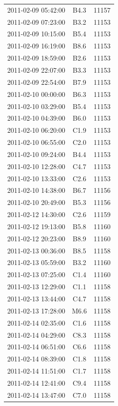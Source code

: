 \documentclass[referee,a4paper,12pt]{swsc}
\begin{document}
\begin{linenumbers}
\begin{longtable}{c|c|c}
		2011-02-09 05:42:00 & B4.3 & 11157 \\ 
		2011-02-09 07:23:00 & B3.2 & 11153 \\ 
		2011-02-09 10:15:00 & B5.4 & 11153 \\ 
		2011-02-09 16:19:00 & B8.6 & 11153 \\ 
		2011-02-09 18:59:00 & B2.6 & 11153 \\ 
		2011-02-09 22:07:00 & B3.3 & 11153 \\ 
		2011-02-09 22:54:00 & B7.9 & 11153 \\ 
		2011-02-10 00:00:00 & B6.3 & 11153 \\ 
		2011-02-10 03:29:00 & B5.4 & 11153 \\ 
		2011-02-10 04:39:00 & B6.0 & 11153 \\ 
		2011-02-10 06:20:00 & C1.9 & 11153 \\ 
		2011-02-10 06:55:00 & C2.0 & 11153 \\ 
		2011-02-10 09:24:00 & B4.4 & 11153 \\ 
		2011-02-10 12:28:00 & C4.7 & 11153 \\ 
		2011-02-10 13:33:00 & C2.6 & 11153 \\ 
		2011-02-10 14:38:00 & B6.7 & 11156 \\ 
		2011-02-10 20:49:00 & B5.3 & 11156 \\ 
		2011-02-12 14:30:00 & C2.6 & 11159 \\ 
		2011-02-12 19:13:00 & B5.8 & 11160 \\ 
		2011-02-12 20:23:00 & B8.9 & 11160 \\ 
		2011-02-13 00:36:00 & B8.5 & 11158 \\ 
		2011-02-13 05:59:00 & B3.2 & 11160 \\ 
		2011-02-13 07:25:00 & C1.4 & 11160 \\ 
		2011-02-13 12:29:00 & C1.1 & 11158 \\ 
		2011-02-13 13:44:00 & C4.7 & 11158 \\ 
		2011-02-13 17:28:00 & M6.6 & 11158 \\ 
		2011-02-14 02:35:00 & C1.6 & 11158 \\ 
		2011-02-14 04:29:00 & C8.3 & 11158 \\ 
		2011-02-14 06:51:00 & C6.6 & 11158 \\ 
		2011-02-14 08:39:00 & C1.8 & 11158 \\ 
		2011-02-14 11:51:00 & C1.7 & 11158 \\ 
		2011-02-14 12:41:00 & C9.4 & 11158 \\ 
		2011-02-14 13:47:00 & C7.0 & 11158 \\ 

\end{longtable}
\end{linenumbers}
\end{document}
